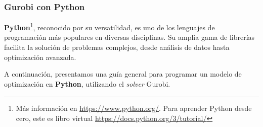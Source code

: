 \subsubsection{Gurobi con Python}

\textbf{Python}\footnote{Más información en \url{https://www.python.org/}. Para aprender Python desde cero, este es libro virtual \url{https://docs.python.org/3/tutorial/}}, reconocido por su versatilidad, es uno de los lenguajes de programación más populares en diversas disciplinas. Su amplia gama de librerías facilita la solución de problemas complejos, desde análisis de datos hasta optimización avanzada.
\vspace{2.5mm}

A continuación, presentamos una guía general para programar un modelo de optimización en \textbf{Python}, utilizando el \textit{solver} Gurobi.


